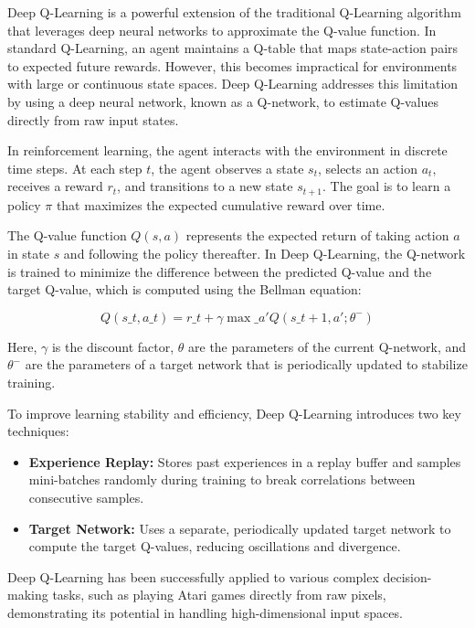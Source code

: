 \documentclass{report}
\begin{document}
Deep Q-Learning is a powerful extension of the traditional Q-Learning algorithm that leverages deep neural networks to approximate the Q-value function. In standard Q-Learning, an agent maintains a Q-table that maps state-action pairs to expected future rewards. However, this becomes impractical for environments with large or continuous state spaces. Deep Q-Learning addresses this limitation by using a deep neural network, known as a Q-network, to estimate Q-values directly from raw input states.

In reinforcement learning, the agent interacts with the environment in discrete time steps. At each step $t$, the agent observes a state $s_t$, selects an action $a_t$, receives a reward $r_t$, and transitions to a new state $s_{t+1}$. The goal is to learn a policy $\pi$ that maximizes the expected cumulative reward over time.

The Q-value function $Q(s, a)$ represents the expected return of taking action $a$ in state $s$ and following the policy thereafter. In Deep Q-Learning, the Q-network is trained to minimize the difference between the predicted Q-value and the target Q-value, which is computed using the Bellman equation:

\begin{equation}
Q(s\_t, a\_t) = r\_t + \gamma \max\_{a'} Q(s\_{t+1}, a'; \theta^-)
\end{equation}

Here, $\gamma$ is the discount factor, $\theta$ are the parameters of the current Q-network, and $\theta^-$ are the parameters of a target network that is periodically updated to stabilize training.

To improve learning stability and efficiency, Deep Q-Learning introduces two key techniques:
\begin{itemize}
\item \textbf{Experience Replay:} Stores past experiences in a replay buffer and samples mini-batches randomly during training to break correlations between consecutive samples.
\item \textbf{Target Network:} Uses a separate, periodically updated target network to compute the target Q-values, reducing oscillations and divergence.
\end{itemize}

Deep Q-Learning has been successfully applied to various complex decision-making tasks, such as playing Atari games directly from raw pixels, demonstrating its potential in handling high-dimensional input spaces.
\end{document}
